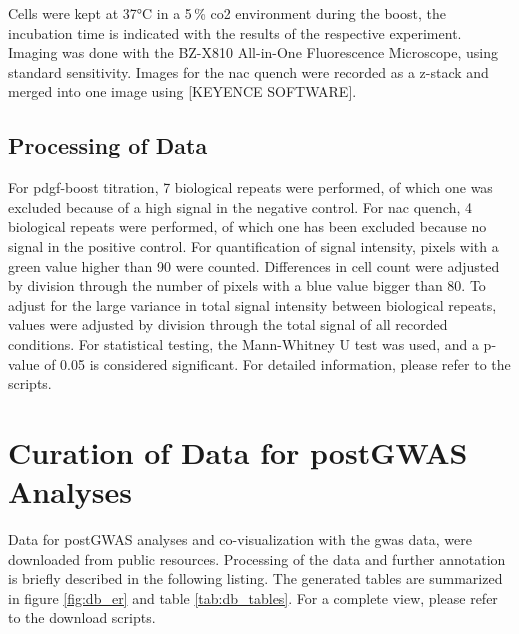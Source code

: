     Cells were kept at 37°C in a 5\,\% \ac{co2} environment during the boost, the incubation time is indicated with the results of the respective experiment. Imaging was done with the BZ-X810 All-in-One Fluorescence Microscope, using standard sensitivity. Images for the \acf{nac} quench were recorded as a z-stack and merged into one image using [KEYENCE SOFTWARE].

    \subsection{Processing of Data}
    \label{subsec:cellrox_data_processing}
    For \ac{pdgf}-boost titration, 7 biological repeats were performed, of which one was excluded because of a high signal in the negative control. For \ac{nac} quench, 4 biological repeats were performed, of which one has been excluded because no signal in the positive control.
    For quantification of signal intensity, pixels with a green value higher than 90 were counted. Differences in cell count were adjusted by division through the number of pixels with a blue value bigger than 80. To adjust for the large variance in total signal intensity between biological repeats, values were adjusted by division through the total signal of all recorded conditions.
    For statistical testing, the Mann-Whitney U test was used, and a p-value of 0.05 is considered significant. For detailed information, please refer to the scripts.


\section{Curation of Data for postGWAS Analyses}
\label{sec:database}
Data for postGWAS analyses and co-visualization with the \ac{gwas} data, were downloaded from public resources. Processing of the data and further annotation is briefly described in the following listing. The generated tables are summarized in figure \ref{fig:db_er} and table \ref{tab:db_tables}. For a complete view, please refer to the download scripts.


